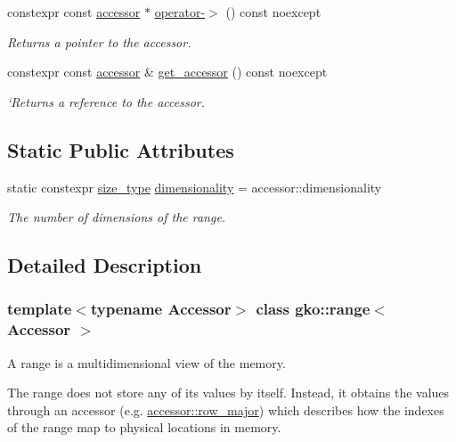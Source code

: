 \begin{DoxyCompactItemize}
constexpr const \hyperlink{classgko_1_1range_a3332728e51dadcf6517847cef3000a17}{accessor} $\ast$ \hyperlink{classgko_1_1range_ad846fcf80cb6cd8881cd7dd8dddc6ca9}{operator-\/$>$} () const noexcept
\begin{DoxyCompactList}\small\item\em Returns a pointer to the accessor. \end{DoxyCompactList}\item 
constexpr const \hyperlink{classgko_1_1range_a3332728e51dadcf6517847cef3000a17}{accessor} \& \hyperlink{classgko_1_1range_ac62f76256fce7442670275827e32d506}{get\+\_\+accessor} () const noexcept
\begin{DoxyCompactList}\small\item\em `\+Returns a reference to the accessor. \end{DoxyCompactList}\end{DoxyCompactItemize}
\subsection*{Static Public Attributes}
\begin{DoxyCompactItemize}
\item 
\mbox{\label{classgko_1_1range_a6796721a162561502474e3150f179167}} 
static constexpr \hyperlink{namespacegko_a6e5c95df0ae4e47aab2f604a22d98ee7}{size\+\_\+type} \hyperlink{classgko_1_1range_a6796721a162561502474e3150f179167}{dimensionality} = accessor\+::dimensionality
\begin{DoxyCompactList}\small\item\em The number of dimensions of the range. \end{DoxyCompactList}\end{DoxyCompactItemize}


\subsection{Detailed Description}
\subsubsection*{template$<$typename Accessor$>$\newline
class gko\+::range$<$ Accessor $>$}

A range is a multidimensional view of the memory. 

The range does not store any of its values by itself. Instead, it obtains the values through an accessor (e.\+g. \hyperlink{classgko_1_1accessor_1_1row__major}{accessor\+::row\+\_\+major}) which describes how the indexes of the range map to physical locations in memory.

